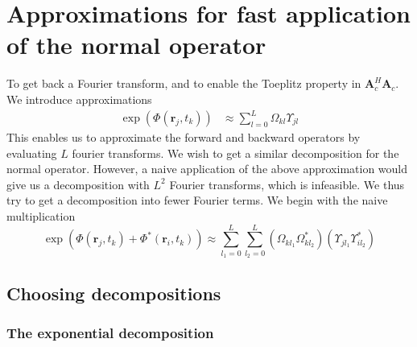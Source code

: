 \documentclass{article}
\begin{document}
\section{Approximations for fast application of the normal operator}
To get back a Fourier transform, and to enable the Toeplitz property in $\mathbf{A}^H_c\mathbf{A}_c$. We introduce 
approximations
\begin{align}
    \exp(\Phi(\mathbf{r}_j, t_k)) &\approx \sum_{l=0}^L \Omega_{kl} \Upsilon_{jl} \label{eq:approx1}
\end{align}
This enables us to approximate the forward and backward operators by evaluating $L$ fourier transforms. 
We wish to get a similar decomposition for the normal operator. However, a naive application of the above approximation would give us a 
decomposition with $L^2$ Fourier transforms, which is infeasible. We thus try to get a decomposition into fewer Fourier terms.
We begin with the naive multiplication
\begin{equation}
    \exp(\Phi(\mathbf{r}_j, t_k) + \Phi^*(\mathbf{r}_i, t_k)) 
        \approx \sum_{l_1=0}^L \sum_{l_2=0}^L (\Omega_{kl_1} \Omega^*_{kl_2})(\Upsilon_{jl_1} \Upsilon^*_{il_2}) \label{eq:normal_op}
\end{equation}

\subsection{Choosing decompositions}
\subsubsection{The exponential decomposition}
\end{document}
